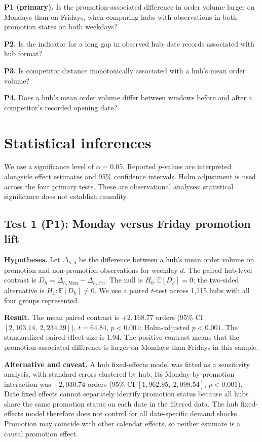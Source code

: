\documentclass[10pt,a4paper,twocolumn]{article}
\begin{document}
\textbf{P1 (primary).} Is the promotion-associated difference in order volume larger on Mondays than on Fridays, when comparing hubs with observations in both promotion states on both weekdays?

\textbf{P2.} Is the indicator for a long gap in observed hub--date records associated with hub format?

\textbf{P3.} Is competitor distance monotonically associated with a hub's mean order volume?

\textbf{P4.} Does a hub's mean order volume differ between windows before and after a competitor's recorded opening date?

\section{Statistical inferences}
We use a significance level of $\alpha=0.05$. Reported $p$-values are interpreted alongside effect estimates and 95\% confidence intervals. Holm adjustment is used across the four primary tests. These are observational analyses; statistical significance does not establish causality.

\subsection{Test 1 (P1): Monday versus Friday promotion lift}
\textbf{Hypotheses.} Let $\Delta_{h,d}$ be the difference between a hub's mean order volume on promotion and non-promotion observations for weekday $d$. The paired hub-level contrast is $D_h=\Delta_{h,\mathrm{Mon}}-\Delta_{h,\mathrm{Fri}}$. The null is $H_0:\mathbb{E}[D_h]=0$; the two-sided alternative is $H_1:\mathbb{E}[D_h]\ne0$. We use a paired $t$-test across 1,115 hubs with all four groups represented.

\textbf{Result.} The mean paired contrast is $+2{,}168.77$ orders (95\% CI $[2{,}103.14,\ 2{,}234.39]$), $t=64.84$, $p<0.001$; Holm-adjusted $p<0.001$. The standardized paired effect size is 1.94. The positive contrast means that the promotion-associated difference is larger on Mondays than Fridays in this sample.

\textbf{Alternative and caveat.} A hub fixed-effects model was fitted as a sensitivity analysis, with standard errors clustered by hub. Its Monday-by-promotion interaction was $+2{,}030.74$ orders (95\% CI $[1{,}962.95,\ 2{,}098.54]$, $p<0.001$). Date fixed effects cannot separately identify promotion status because all hubs share the same promotion status on each date in the filtered data. The hub fixed-effects model therefore does not control for all date-specific demand shocks. Promotion may coincide with other calendar effects, so neither estimate is a causal promotion effect.
\end{document}
